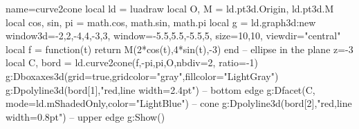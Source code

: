 \begin{luadraw}{name=curve2cone}
local ld = luadraw
local O, M = ld.pt3d.Origin, ld.pt3d.M
local cos, sin, pi = math.cos, math.sin, math.pi
local g = ld.graph3d:new{ window3d={-2,2,-4,4,-3,3}, window={-5.5,5.5,-5.5,5},
    size={10,10}, viewdir="central"}
local f = function(t) return M(2*cos(t),4*sin(t),-3) end -- ellipse in the plane z=-3
local C, bord = ld.curve2cone(f,-pi,pi,O,{nbdiv=2, ratio=-1})
g:Dboxaxes3d({grid=true,gridcolor="gray",fillcolor="LightGray"})
g:Dpolyline3d(bord[1],"red,line width=2.4pt") -- bottom edge
g:Dfacet(C, {mode=ld.mShadedOnly,color="LightBlue"}) -- cone
g:Dpolyline3d(bord[2],"red,line width=0.8pt") -- upper edge
g:Show()
\end{luadraw}
